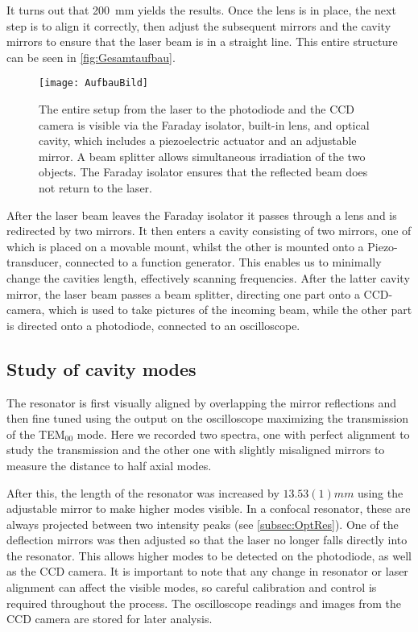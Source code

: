 It turns out that \SI{200}{mm} yields the results. Once the lens is in place, the next step is to align it correctly, then adjust the subsequent mirrors and the cavity mirrors to ensure that the laser beam is in a straight line. This entire structure can be seen in \autoref{fig:Gesamtaufbau}. 

\begin{figure}[H]
	\centering
	\texttt{[image: AufbauBild]}
	\caption{The entire setup from the laser to the photodiode and the CCD camera is visible via the Faraday isolator, built-in lens, and optical cavity, which includes a piezoelectric actuator and an adjustable mirror. A beam splitter allows simultaneous irradiation of the two objects. The Faraday isolator ensures that the reflected beam does not return to the laser.}
	\label{fig:Gesamtaufbau}
\end{figure}

After the laser beam leaves the Faraday isolator it passes through a lens and is redirected by two mirrors. It then enters a cavity consisting of two mirrors, one of which is placed on a movable mount, whilst the other is mounted onto a Piezo-transducer, connected to a function generator. This enables us to minimally change the cavities length, effectively scanning frequencies. After the latter cavity mirror, the laser beam passes a beam splitter, directing one part onto a CCD-camera, which is used to take pictures of the incoming beam, while the other part is directed onto a photodiode, connected to an oscilloscope.

\subsection{Study of cavity modes}
\label{subsec:CavityModes}
The resonator is first visually aligned by overlapping the mirror reflections and then fine tuned using the output on the oscilloscope maximizing the transmission of the TEM$_{00}$ mode. Here we recorded two spectra, one with perfect alignment to study the transmission and the other one with slightly misaligned mirrors to measure the distance to half axial modes.

After this, the length of the resonator was increased by \( 13.53(1) \unit{mm} \) using the adjustable mirror to make higher modes visible. In a confocal resonator, these are always projected between two intensity peaks (see \autoref{subsec:OptRes}). One of the deflection mirrors was then adjusted so that the laser no longer falls directly into the resonator. This allows higher modes to be detected on the photodiode, as well as the CCD camera. It is important to note that any change in resonator or laser alignment can affect the visible modes, so careful calibration and control is required throughout the process. The oscilloscope readings and images from the CCD camera are stored for later analysis.

